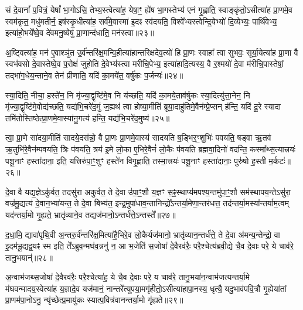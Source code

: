 सं दे॒वानां᳚ प॒वित्रं॒ येषां᳚ भा॒गो\-ऽसि॒ तेभ्य॒स्त्वेत्या॑ह॒ येषा॒ꣳ॒ ह्ये॑ष भा॒गस्तेभ्य॑ एनं गृ॒ह्णाति॒ स्वाङ्कृ॑तो॒\-ऽसीत्या॑ह प्रा॒णमे॒व स्वम॑कृत॒ मधु॑मतीर्न॒ इष॑स्कृ॒धीत्या॑ह॒ सर्व॑मे॒वास्मा॑ इ॒दꣴ स्व॑दयति॒ विश्वे᳚भ्यस्त्वेन्द्रि॒येभ्यो॑ दि॒व्येभ्यः॒ पार्थि॑वेभ्य॒ इत्या॑हो॒भये᳚ष्वे॒व दे॑वमनु॒ष्येषु॑ प्रा॒णान्द॑धाति॒ मन॑स्त्वा॥२३॥

अ॒ष्ट्वित्या॑ह॒ मन॑ ए॒वाश्ञु॑त उ॒र्व॑न्तरि॑क्ष॒मन्वि॒हीत्या॑हान्तरिक्षदेव॒त्यो॑ हि प्रा॒णः स्वाहा᳚ त्वा सुभवः॒ सूर्या॒येत्या॑ह प्रा॒णा वै स्वभ॑वसो दे॒वास्तेष्वे॒व प॒रोक्षं॑ जुहोति दे॒वेभ्य॑स्त्वा मरीचि॒पेभ्य॒ इत्या॑हादि॒त्यस्य॒ वै र॒श्मयो॑ दे॒वा म॑रीचि॒पास्तेषां॒ तद्भा॑ग॒धेय॒न्ताने॒व तेन॑ प्रीणाति॒ यदि॑ का॒मये॑त॒ वर्\mbox{}षु॑कः प॒र्जन्यः॑॥२४॥

स्या॒दिति॒ नीचा॒ हस्ते॑न॒ नि मृ॑ज्या॒द्वृष्टि॑मे॒व नि य॑च्छति॒ यदि॑ का॒मये॒ताव॑र्\mbox{}षुकः स्या॒दित्यु॑त्ता॒नेन॒ नि मृ॑ज्या॒द्वृष्टि॑मे॒वोद्य॑च्छति॒ यद्य॑भि॒चरे॑द॒मुं ज॒ह्यथ॑ त्वा होष्या॒मीति॑ ब्रूया॒दाहु॑तिमे॒वैन॑म्प्रे॒प्सन् ह॑न्ति॒ यदि॑ दू॒रे स्यादा तमि॑तोस्तिष्ठेत्प्रा॒णमे॒वास्या॑नु॒गत्य॑ हन्ति॒ यद्य॑भि॒चरे॑द॒मुष्य॑॥२५॥

त्वा॒ प्रा॒णे सा॑दया॒मीति॑ सादये॒दस॑न्नो॒ वै प्रा॒णः प्रा॒णमे॒वास्य॑ सादयति ष॒ड्भिर॒ꣳ॒शुभिः॑ पवयति॒ षड्वा ऋ॒तव॑ ऋ॒तुभि॑रे॒वैन॑म्पवयति॒ त्रिः प॑वयति॒ त्रय॑ इ॒मे लो॒का ए॒भिरे॒वैनं॑ लो॒कैः प॑वयति ब्रह्मवा॒दिनो॑ वदन्ति॒ कस्मा᳚थ्स॒त्यात्त्रयः॑ पशू॒नाꣳ हस्ता॑दाना॒ इति॒ यत्त्रिरु॑पा॒ꣳ॒शुꣳ हस्ते॑न विगृ॒ह्णाति॒ तस्मा॒त्त्रयः॑ पशू॒नाꣳ हस्ता॑दानाः॒ पुरु॑षो ह॒स्ती म॒र्कटः॑॥२६॥

{\anuvakamend[{माध्य॑न्दिनम॒ष्टाव॑ष्टावे॒ष मन॑स्त्वा प॒र्जन्यो॒\-ऽमुष्य॒ पुरु॑षो॒ द्वे च॑॥५॥}]}

दे॒वा वै यद्य॒ज्ञे\-ऽकु॑र्वत॒ तदसु॑रा अकुर्वत॒ ते दे॒वा उ॑पा॒ꣳ॒शौ य॒ज्ञꣳ स॒ꣴ॒स्थाप्य॑मपश्य॒न्तमु॑पा॒ꣳ॒शौ सम॑स्थापय॒न्ते\-ऽसु॑रा॒ वज्र॑मु॒द्यत्य॑ दे॒वान॒भ्या॑यन्त॒ ते दे॒वा बिभ्य॑त॒ इन्द्र॒मुपा॑धाव॒न्तानिन्द्रो᳚\-ऽन्तर्या॒मेणा॒न्तर॑धत्त॒ तद॑न्तर्या॒मस्या᳚न्तर्याम॒त्वम् यद॑न्तर्या॒मो गृ॒ह्यते॒ भ्रातृ॑व्याने॒व तद्यज॑मानो॒\-ऽन्तर्ध॑त्ते॒\-ऽन्तस्ते᳚॥२७॥

द॒धा॒मि॒ द्यावा॑पृथि॒वी अ॒न्तरु॒र्व॑न्तरि॑क्ष॒मित्या॑है॒भिरे॒व लो॒कैर्यज॑मानो॒ भ्रातृ॑व्यान॒न्तर्ध॑त्ते॒ ते दे॒वा अ॑मन्य॒न्तेन्द्रो॒ वा इ॒दम॑भू॒द्यद्व॒यꣴ स्म इति॒ ते᳚\-ऽब्रुव॒न्मघ॑व॒न्ननु॑ न॒ आ भ॒जेति॑ स॒जोषा॑ दे॒वैरव॑रैः॒ परै॒श्चेत्य॑ब्रवी॒द्ये चै॒व दे॒वाः परे॒ ये चाव॑रे॒ तानु॒भयान्॑॥२८॥

अ॒न्वाभ॑जथ्स॒जोषा॑ दे॒वैरव॑रैः॒ परै॒श्चेत्या॑ह॒ ये चै॒व दे॒वाः परे॒ य चाव॑रे॒ तानु॒भया॑न॒न्वाभ॑जत्यन्तर्या॒मे म॑घवन्मादय॒स्वेत्या॑ह य॒ज्ञादे॒व यज॑मानं॒ नान्तरे᳚त्युपया॒मगृ॑हीतो॒\-ऽसीत्या॑हापा॒नस्य॒ धृत्यै॒ यदु॒भाव॑पवि॒त्रौ गृ॒ह्येया॑तां प्रा॒णम॑पा॒नो\-ऽनु॒ न्यृ॑च्छेत्प्र॒मायु॑कः स्यात्प॒वित्र॑वानन्तर्या॒मो गृ॑ह्यते॥२९॥

